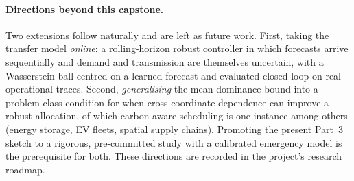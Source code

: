 \documentclass[12pt]{article}
\begin{document}
\paragraph{Directions beyond this capstone.} Two extensions follow naturally and are
left as future work. First, taking the transfer model \emph{online}: a rolling-horizon
robust controller in which forecasts arrive sequentially and demand and transmission are
themselves uncertain, with a Wasserstein ball centred on a learned forecast and evaluated
closed-loop on real operational traces. Second, \emph{generalising} the mean-dominance
bound into a problem-class condition for when cross-coordinate dependence can improve a
robust allocation, of which carbon-aware scheduling is one instance among others (energy
storage, EV fleets, spatial supply chains). Promoting the present Part~3 sketch to a
rigorous, pre-committed study with a calibrated emergency model is the prerequisite for
both. These directions are recorded in the project's research roadmap.
\end{document}
